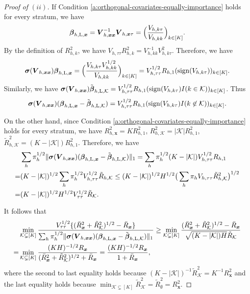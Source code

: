 \documentclass[12pt]{article}
\newcommand{\Lin}{\textnormal{L}}
\newcommand{\mk}{\mathcal{K}}
\newcommand{\bs}{\boldsymbol}
\newcommand{\vtt}{V_{\tau\tau}}
\begin{document}
\begin{proof}[Proof of  $(ii)$]
If Condition \ref{a:orthogonal-covariates-equally-importance} holds for every stratum, we have
\begin{align*}
    \bs{\beta}_{h, \Lin , \bs{x}} = \bs{V}_{h,\bs{x}\bs{x}}^{-1} \bs{V}_{h,\bs{x}\tau} = \Big(\frac{V_{h,k\tau}}{{V}_{h,kk}}\Big)_{k\in [K]} . 
\end{align*}
By the definition of $R_{h,k}^2$, we have $V_{h,\tau\tau} R_{h,k}^2 = V_{h,kk}^{-1}V_{h,k\tau}^2.$
Therefore, we have
\[
\bs{\sigma}(\bs{V}_{h,\bs{x}\bs{x}})\bs{\beta}_{h, \Lin , \bs{x}} = \Big(\frac{V_{h,k\tau}V_{h,kk}^{1/2}}{{V}_{h,kk}}\Big)_{k\in [K]}   = V_{h,\tau\tau}^{1/2}R_{h,1} (\operatorname{sign}(V_{h,k\tau}))_{k\in [K]} .
\]
Similarly, we have $\bs{\sigma}(\bs{V}_{h,\bs{x}\bs{x}})\tilde{\bs{\beta}}_{h,\Lin,\mk} = V_{h,\tau\tau}^{1/2} R_{h,1} (\operatorname{sign}(V_{h,k\tau})I(k\in \mk))_{k\in [K]} $. Thus
\begin{align}
\label{eq:sigma-Vhxx-beta-h-lin-beta-h-lin-mk}
    \bs{\sigma}(\bs{V}_{h,\bs{x}\bs{x}})(\bs{\beta}_{h, \Lin , \bs{x}}-\tilde{\bs{\beta}}_{h,\Lin, \mk}) = V_{h,\tau\tau}^{1/2} R_{h,1} (\operatorname{sign}(V_{h,k\tau})I(k\not\in \mk))_{k\in [K]}.
\end{align}

On the other hand, since Condition \ref{a:orthogonal-covariates-equally-importance} holds for every stratum, we have $R^2_{h,\bs{x}} = K R_{h,1}^2$, $R^2_{h,\mk} = |\mk| R_{h,1}^2$, $\tilde{R}^2_{h,\mk} = (K-|\mk|) R_{h,1}^2$. Therefore, we have
\begin{align*}
        &\sum_{h} \pi_{h}^{1/2}\|\bs{\sigma}(\bs{V}_{h,\bs{x}\bs{x}})(\bs{\beta}_{h, \Lin , \bs{x}}-\tilde{\bs{\beta}}_{h,\Lin, \mk})\|_1 = \sum_{h}\pi_h^{1/2} (K-|\mk|)V_{h,\tau\tau}^{1/2}R_{h,1}\\
       = & (K-|\mk|)^{1/2} \sum_{h}\pi_h^{1/2} V_{h,\tau\tau}^{1/2}\tilde{R}_{h,\mk} \leq  (K-|\mk|)^{1/2} H^{1/2} \big(\sum_{h}\pi_h V_{h,\tau\tau}\tilde{R}_{h,\mk}^2\big)^{1/2} \\
       = & (K-|\mk|)^{1/2} H^{1/2} V_{\tau\tau}^{1/2}\tilde{R}_{\mk}.
    \end{align*}

   It follows that
    \begin{align*}
       &\min_{\mk \subsetneq [K]}\frac{\vtt^{1/2}\{(\bar{R}_{\bs{x}}^2 + \tilde{R}^2_{\mk})^{1/2}-\bar{R}_{\bs{x}}\}}{\sum_{h}\pi_{h}^{1/2}\|\bs{\sigma}(\bs{V}_{h,\bs{x}\bs{x}})(\bs{\beta}_{h, \Lin , \bs{x}}-\tilde{\bs{\beta}}_{h,\Lin,\mk})\|_1} \geq \min_{\mk\subsetneq [K]}\frac{(\bar{R}_{\bs{x}}^2 + \tilde{R}^2_{\mk})^{1/2}-\bar{R}_{\bs{x}}}{\sqrt{(K-|\mk|)H}\tilde{R}_{\mk}} 
      \\
      =&  \min_{\mk \subsetneq [K]} \frac{(KH)^{-1/2}R_{\bs{x}}}{(\bar{R}_{\bs{x}}^2 + \tilde{R}^2_{\mk})^{1/2}+\bar{R}_{\bs{x}}} = \frac{(KH)^{-1/2}R_{\bs{x}}}{1+\bar{R}_{\bs{x}}},
    \end{align*}
where the second to last equality holds because $(K-|\mk|)^{-1} \tilde{R}_{\mk}^2 = K^{-1}  R_{\bs{x}}^2$ and the last equality holds because $\min_{\mk \subsetneq [K]} \tilde{R}^2_{\mk} = \tilde{R}^2_{\emptyset}=R_{\bs{x}}^2$.


\end{proof}
\end{document}
